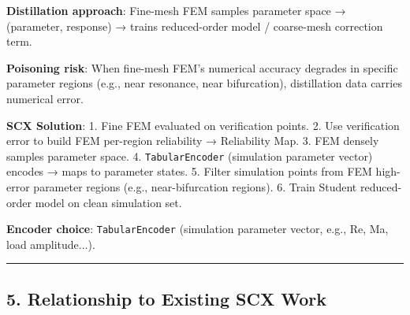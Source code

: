 \documentclass[
  12pt,
]{article}
\begin{document}
\textbf{Distillation approach}: Fine-mesh FEM samples parameter space → (parameter, response) → trains reduced-order model / coarse-mesh correction term.

\textbf{Poisoning risk}: When fine-mesh FEM's numerical accuracy degrades in specific parameter regions (e.g., near resonance, near bifurcation), distillation data carries numerical error.

\textbf{SCX Solution}: 1. Fine FEM evaluated on verification points. 2. Use verification error to build FEM per-region reliability → Reliability Map. 3. FEM densely samples parameter space. 4. \texttt{TabularEncoder} (simulation parameter vector) encodes → maps to parameter states. 5. Filter simulation points from FEM high-error parameter regions (e.g., near-bifurcation regions). 6. Train Student reduced-order model on clean simulation set.

\textbf{Encoder choice}: \texttt{TabularEncoder} (simulation parameter vector, e.g., Re, Ma, load amplitude...).

\begin{center}\rule{0.5\linewidth}{0.5pt}\end{center}

\subsection{5. Relationship to Existing SCX Work}\label{relationship-to-existing-scx-work}
\end{document}
